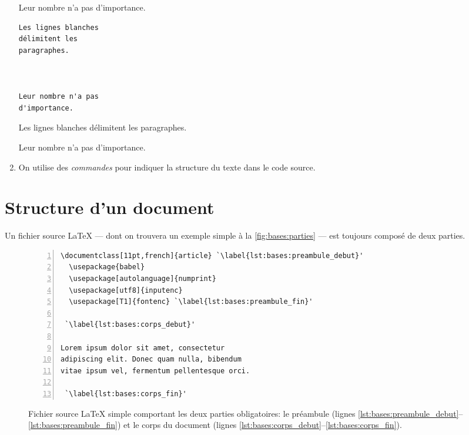 \begin{enumerate}
\begin{demo}
\begin{texample}
        Leur nombre n'a pas
        d'importance.
    \end{texample}
\begin{texample}
\begin{lstlisting}
Les lignes blanches
délimitent les
paragraphes.



Leur nombre n'a pas
d'importance.
\end{lstlisting}
      \producing
        Les lignes blanches  délimitent
        les paragraphes.



        Leur nombre n'a pas
        d'importance.
    \end{texample}
  \end{demo}
%
\item On utilise des \emph{commandes} pour indiquer la structure du
  texte dans le code source.
\end{enumerate}


\section{Structure d'un document}
\label{chap:bases:structure}

Un fichier source {\LaTeX} --- dont on trouvera un exemple simple à la
\autoref{fig:bases:parties} --- est toujours composé de deux parties.

\begin{figure}
  \centering
  \begin{minipage}{0.75\linewidth}
\begin{lstlisting}[numbers=left, numberstyle=\tiny]
\documentclass[11pt,french]{article} `\label{lst:bases:preambule_debut}'
  \usepackage{babel}
  \usepackage[autolanguage]{numprint}
  \usepackage[utf8]{inputenc}
  \usepackage[T1]{fontenc} `\label{lst:bases:preambule_fin}'

 `\label{lst:bases:corps_debut}'

Lorem ipsum dolor sit amet, consectetur
adipiscing elit. Donec quam nulla, bibendum
vitae ipsum vel, fermentum pellentesque orci.

 `\label{lst:bases:corps_fin}'
\end{lstlisting}
  \end{minipage}
  \caption{Fichier source {\LaTeX} simple comportant les deux parties
    obligatoires: le préambule (lignes
    \ref*{lst:bases:preambule_debut}--\ref*{lst:bases:preambule_fin})
    et le corps du document (lignes
    \ref*{lst:bases:corps_debut}--\ref*{lst:bases:corps_fin}).}
  \label{fig:bases:parties}
\end{figure}

